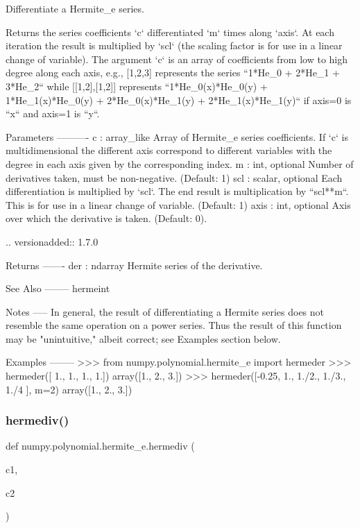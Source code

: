 \begin{DoxyVerb}Differentiate a Hermite_e series.

Returns the series coefficients `c` differentiated `m` times along
`axis`.  At each iteration the result is multiplied by `scl` (the
scaling factor is for use in a linear change of variable). The argument
`c` is an array of coefficients from low to high degree along each
axis, e.g., [1,2,3] represents the series ``1*He_0 + 2*He_1 + 3*He_2``
while [[1,2],[1,2]] represents ``1*He_0(x)*He_0(y) + 1*He_1(x)*He_0(y)
+ 2*He_0(x)*He_1(y) + 2*He_1(x)*He_1(y)`` if axis=0 is ``x`` and axis=1
is ``y``.

Parameters
----------
c : array_like
    Array of Hermite_e series coefficients. If `c` is multidimensional
    the different axis correspond to different variables with the
    degree in each axis given by the corresponding index.
m : int, optional
    Number of derivatives taken, must be non-negative. (Default: 1)
scl : scalar, optional
    Each differentiation is multiplied by `scl`.  The end result is
    multiplication by ``scl**m``.  This is for use in a linear change of
    variable. (Default: 1)
axis : int, optional
    Axis over which the derivative is taken. (Default: 0).

    .. versionadded:: 1.7.0

Returns
-------
der : ndarray
    Hermite series of the derivative.

See Also
--------
hermeint

Notes
-----
In general, the result of differentiating a Hermite series does not
resemble the same operation on a power series. Thus the result of this
function may be "unintuitive," albeit correct; see Examples section
below.

Examples
--------
>>> from numpy.polynomial.hermite_e import hermeder
>>> hermeder([ 1.,  1.,  1.,  1.])
array([1.,  2.,  3.])
>>> hermeder([-0.25,  1.,  1./2.,  1./3.,  1./4 ], m=2)
array([1.,  2.,  3.])\end{DoxyVerb}
 \mbox{\label{namespacenumpy_1_1polynomial_1_1hermite__e_a3598edc81fdb0924ca25ce3afc084339}} 
\subsubsection{\texorpdfstring{hermediv()}{hermediv()}}
{\footnotesize\ttfamily def numpy.\+polynomial.\+hermite\+\_\+e.\+hermediv (\begin{DoxyParamCaption}\item[{}]{c1,  }\item[{}]{c2 }\end{DoxyParamCaption})}

